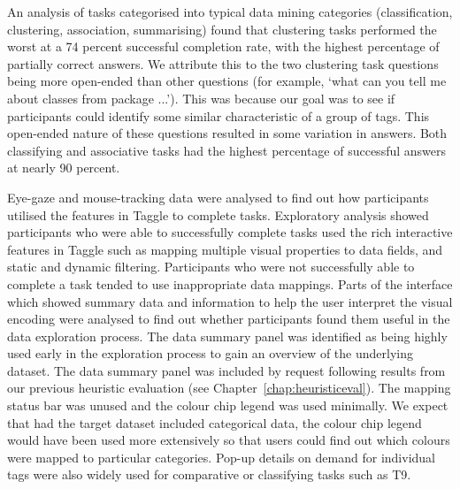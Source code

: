 An analysis of tasks categorised into typical data mining categories (classification, clustering, association, summarising) found that clustering tasks performed the worst at a 74 percent successful completion rate, with the highest percentage of partially correct answers. We attribute this to the two clustering task questions being more open-ended than other questions (for example, `what can you tell me about classes from package ...'). This was because our goal was to see if participants could identify some similar characteristic of a group of tags. This open-ended nature of these questions resulted in some variation in answers. Both classifying and associative tasks had the highest percentage of successful answers at nearly 90 percent.

Eye-gaze and mouse-tracking data were analysed to find out how participants utilised the features in Taggle to complete tasks. Exploratory analysis showed participants who were able to successfully complete tasks used the rich interactive features in Taggle such as mapping multiple visual properties to data fields, and static and dynamic filtering. Participants who were not successfully able to complete a task tended to use inappropriate data mappings. Parts of the interface which showed summary data and information to help the user interpret the visual encoding were analysed to find out whether participants found them useful in the data exploration process. The data summary panel was identified as being highly used early in the exploration process to gain an overview of the underlying dataset. The data summary panel was included by request following results from our previous heuristic evaluation (see Chapter~\ref{chap:heuristiceval}). The mapping status bar was unused and the colour chip legend was used minimally. We expect that had the target dataset included categorical data, the colour chip legend would have been used more extensively so that users could find out which colours were mapped to particular categories. Pop-up details on demand for individual tags were also widely used for comparative or classifying tasks such as T9.

